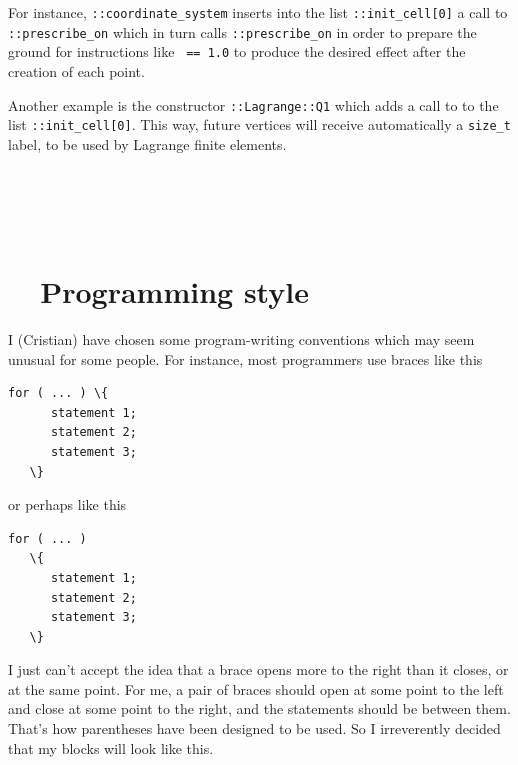 For instance, {\small\tt {}::coordinate\_system} inserts into the list
{\small\tt {}::init\_cell[0]} a call to {\small\tt {}::prescribe\_on} which in turn calls
{\small\tt {}::prescribe\_on} in order to prepare the ground for instructions like
{\small\tt {} == 1.0} to produce the desired effect after the creation of each point.

Another example is the constructor {\small\tt{}::Lagrange::Q1} which
adds a call to to
the list {\small\tt{}::init\_cell[0]}.
This way, future vertices will receive automatically a {\small\tt size\_t} label, to be used
by Lagrange finite elements.


\section{~~\cinza{[empty]}}\label{\numb section 11.\numb parag 11}


\section{~~Programming style}\label{\numb section 11.\numb parag 12}

I (Cristian) have chosen some program-writing conventions which may seem unusual for some people.
For instance, most programmers use braces like this

\begin{Verbatim}[commandchars=\\\{\},formatcom=\small\tt,baselinestretch=0.94]
   for ( ... ) \{
      statement 1;
      statement 2;
      statement 3;
   \}
\end{Verbatim}

or perhaps like this

\begin{Verbatim}[commandchars=\\\{\},formatcom=\small\tt,baselinestretch=0.94]
   for ( ... )
   \{
      statement 1;
      statement 2;
      statement 3;
   \}
\end{Verbatim}

I just can't accept the idea that a brace opens more to the right than it closes, or at the
same point.
For me, a pair of braces should open at some point to the left and close at some point to the
right, and the statements should be between them.
That's how parentheses have been designed to be used.
So I irreverently decided that my blocks will look like this.

